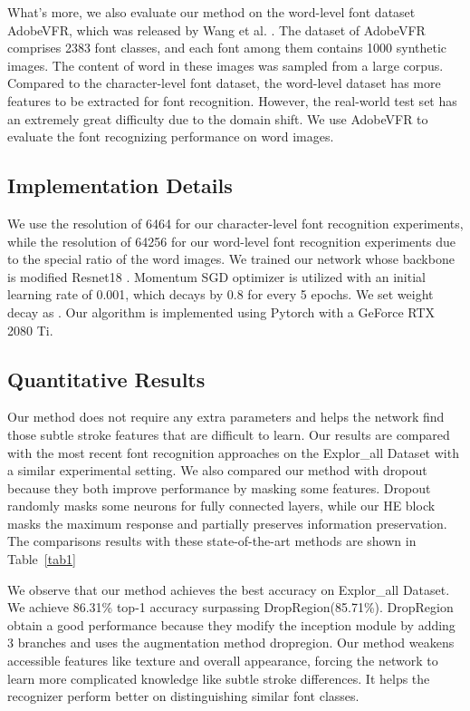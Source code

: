\documentclass[manuscript,screen]{acmart}
\begin{document}
What's more, we also evaluate our method on the word-level font dataset AdobeVFR, which was released by Wang et al. \cite{wang_deepfont_2015}. The dataset of AdobeVFR comprises 2383 font classes, and each font among them contains 1000 synthetic images. The content of word in these images was sampled from a large corpus. Compared to the character-level font dataset, the word-level dataset has more features to be extracted for font recognition. However, the real-world test set has an extremely great difficulty due to the domain shift. We use AdobeVFR to evaluate the font recognizing performance on word images.

\subsection{Implementation Details}
We use the resolution of 6464 for our character-level font recognition experiments, while the resolution of 64256 for our word-level font recognition experiments due to the special ratio of the word images. We trained our network whose backbone is modified Resnet18 \cite{he2016deep}. Momentum SGD optimizer is utilized with an initial learning rate of 0.001, which decays by 0.8 for every 5 epochs. We set weight decay as . Our algorithm is implemented using Pytorch \cite{paszke2017automatic} with a GeForce RTX 2080 Ti.

\subsection{Quantitative Results}
Our method does not require any extra parameters and helps the network find those subtle stroke features that are difficult to learn. Our results are compared with the most recent font recognition approaches on the Explor\_all Dataset with a similar experimental setting. We also compared our method with dropout because they both improve performance by masking some features. Dropout randomly masks some neurons for fully connected layers, while our HE block masks the maximum response and partially preserves information preservation. The comparisons results with these state-of-the-art methods are shown in Table~\ref{tab1}

We observe that our method achieves the best accuracy on Explor\_all Dataset. We achieve 86.31\% top-1 accuracy surpassing DropRegion\cite{huang_dropregion_2018}(85.71\%). DropRegion\cite{huang_dropregion_2018} obtain a good performance because they modify the inception module by adding 3 branches and uses the augmentation method dropregion. Our method weakens accessible features like texture and overall appearance, forcing the network to learn more complicated knowledge like subtle stroke differences. It helps the recognizer perform better on distinguishing similar font classes.
\end{document}
